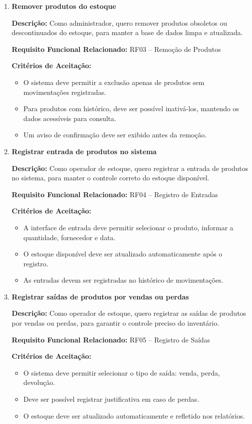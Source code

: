 \documentclass[
	12pt,				%
	openright,			%
	twoside,			%
	a4paper,			%
	english,			%
	french,				%
	spanish,			%
	brazil				%
	]{abntex2}
\begin{document}
\begin{enumerate}
\item \textbf{Remover produtos do estoque}

\textbf{Descrição:} Como administrador, quero remover produtos obsoletos ou descontinuados do estoque, para manter a base de dados limpa e atualizada.

\textbf{Requisito Funcional Relacionado:} RF03 -- Remoção de Produtos

\textbf{Critérios de Aceitação:}
\begin{itemize}
  \item O sistema deve permitir a exclusão apenas de produtos sem movimentações registradas.
  \item Para produtos com histórico, deve ser possível inativá-los, mantendo os dados acessíveis para consulta.
  \item Um aviso de confirmação deve ser exibido antes da remoção.
\end{itemize}

\item \textbf{Registrar entrada de produtos no sistema}

\textbf{Descrição:} Como operador de estoque, quero registrar a entrada de produtos no sistema, para manter o controle correto do estoque disponível.

\textbf{Requisito Funcional Relacionado:} RF04 -- Registro de Entradas

\textbf{Critérios de Aceitação:}
\begin{itemize}
  \item A interface de entrada deve permitir selecionar o produto, informar a quantidade, fornecedor e data.
  \item O estoque disponível deve ser atualizado automaticamente após o registro.
  \item As entradas devem ser registradas no histórico de movimentações.
\end{itemize}

\item \textbf{Registrar saídas de produtos por vendas ou perdas}

\textbf{Descrição:} Como operador de estoque, quero registrar as saídas de produtos por vendas ou perdas, para garantir o controle preciso do inventário.

\textbf{Requisito Funcional Relacionado:} RF05 -- Registro de Saídas

\textbf{Critérios de Aceitação:}
\begin{itemize}
  \item O sistema deve permitir selecionar o tipo de saída: venda, perda, devolução.
  \item Deve ser possível registrar justificativa em caso de perdas.
  \item O estoque deve ser atualizado automaticamente e refletido nos relatórios.
\end{itemize}


\end{enumerate}
\end{document}
